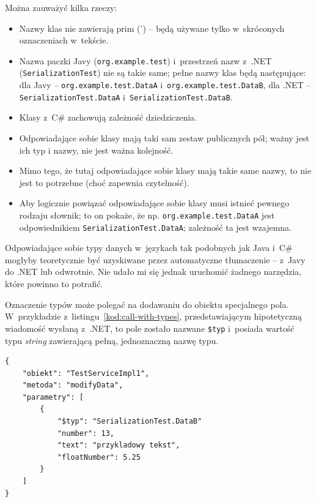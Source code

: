 Można zauważyć kilka rzeczy:
\begin{itemize}
	\item Nazwy klas nie zawierają prim (') -- będą używane tylko w~skróconych oznaczeniach w~tekście.
	\item Nazwa paczki Javy (\texttt{org.example.test}) i~przestrzeń nazw z~.NET (\texttt{SerializationTest}) nie są takie same; pełne nazwy klas będą następujące: dla Javy -- \texttt{org.example.test.DataA} i~\texttt{org.example.test.DataB}, dla .NET -- \texttt{SerializationTest.DataA} i~\texttt{SerializationTest.DataB}.
	\item Klasy z~C\# zachowują zależność dziedziczenia.
	\item Odpowiadające sobie klasy mają taki sam zestaw publicznych pól; ważny jest ich typ i nazwy, nie jest ważna kolejność.
	\item Mimo tego, że tutaj odpowiadające sobie klasy mają takie same nazwy, to nie jest to potrzebne (choć zapewnia czytelność).
	\item Aby logicznie powiązać odpowiadające sobie klasy musi istnieć pewnego rodzaju słownik; to on pokaże, że np. \texttt{org.example.test.DataA} jest odpowiednikiem \texttt{SerializationTest.DataA}; zależność ta jest wzajemna.
\end{itemize}


Odpowiadające sobie typy danych w~językach tak podobnych jak Java i~C\# mogłyby teoretycznie być uzyskiwane przez automatyczne tłumaczenie -- z~Javy do .NET lub odwrotnie.
Nie udało mi się jednak uruchomić żadnego narzędzia, które powinno to potrafić.

Oznaczenie typów może polegać na dodawaniu do obiektu specjalnego pola. W~przykładzie z~listingu~\ref{kod:call-with-types}, przedstawiającym hipotetyczną wiadomość wysłaną z~.NET, to pole zostało nazwane \texttt{\$typ} i~posiada wartość typu \emph{string} zawierającą pełną, jednoznaczną nazwę typu.

\begin{lstlisting}[frame=single, float, caption={Przykład wywołania zdalnej metody zawierającego informację o~typach.}, label=kod:call-with-types]
{
    "obiekt": "TestServiceImpl1",
    "metoda": "modifyData",
    "parametry": [
        {
            "$typ": "SerializationTest.DataB"
            "number": 13,
            "text": "przykladowy tekst",
            "floatNumber": 5.25
        }
    ]
}
\end{lstlisting}


